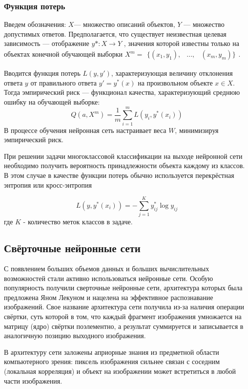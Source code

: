     



\subsubsection{Функция потерь}
Введем обозначения: $X$— множество описаний объектов, $Y$ — множество допустимых ответов. Предполагается, что существует неизвестная целевая зависимость — отображение $y* : X \rightarrow Y$ , значения которой известны только на объектах конечной обучающей выборки 
$X^m = \begin{matrix}\{ (x_1, y_1), & ..., & (x_m, y_m)  \}\end{matrix}$.

Вводится функция потерь $L(y, y')$, характеризующая величину отклонения ответа $y$ от правильного ответа $y' = y^*(x)$ на произвольном объекте $x \in X$. Тогда эмпирический риск \cite{classification} — функционал качества, характеризующий среднюю ошибку на обучающей выборке:
\[
    Q(a,X^m)= \dfrac{1}{m} \sum^m_{i=1} L(y_i,y^*(x_i))
\]
В процессе обучения нейронная сеть настраивает веса $W$, минимизируя эмпирический риск.

При решении задачи многоклассовой классификации на выходе нейронной сети необходимо получить вероятность принадлежности объекта каждому из классов. В этом случае в качестве функции потерь обычно используется перекрёстная энтропия или кросс-энтропия

\[
L(y, y^*(x_i)) = -\sum^K_{j=1}y^*_{ij} \log y_{ij}
\]
где $K$ - количество меток классов в задаче.
 
\subsection{Свёрточные нейронные сети} \label{convnets}
С появлением больших объемов данных и больших вычислительных возможностей стали активно использоваться нейронные сети. Особую популярность получили сверточные нейронные сети, архитектура которых была предложена Яном Лекуном \cite{LeCun1998GradientbasedLA} и нацелена на эффективное распознавание изображений. Свое название архитектура сети получила из-за наличия операции свёртки, суть которой в том, что каждый фрагмент изображения умножается на матрицу (ядро) свёртки поэлементно, а результат суммируется и записывается в аналогичную позицию выходного изображения. 

В архитектуру сети заложены априорные знания из предметной области компьютерного зрения: пиксель изображения сильнее связан с соседним (локальная корреляция) и объект на изображении может встретиться в любой части изображения.

